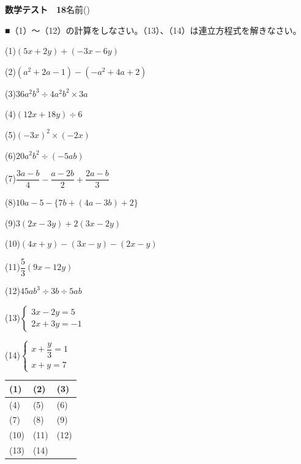 \documentclass[a4paper,11pt]{ltjsarticle}
\newlength{\qcol}\setlength{\qcol}{0.47\textwidth}
\newlength{\qgap}
\newlength{\anscolw}\setlength{\anscolw}{0.30\textwidth}
\newlength{\ansh}
\newcommand{\Q}[2]{\parbox[t]{\qcol}{\raggedright (#1)\hspace{0.6em}$\displaystyle #2$}}
\newcommand{\QR}[4]{\Q{#1}{#2}\hfill\Q{#3}{#4}\par\vspace{\qgap}}
\newcommand{\anscell}[1]{\rule[-\ansdrop]{0pt}{\ansh}(#1)}
\newlength{\ansdrop}
\begin{document}
{\large\bfseries 数学テスト　18}\hfill 名前(\underline{\hspace{32mm}})\par\vspace{3mm}
■（1）〜（12）の計算をしなさい。（13）、（14）は連立方程式を解きなさい。\par\vspace{3mm}
\setlength{\qgap}{11mm}
\QR{1}{(5x+2y)+(-3x-6y)}{2}{(a^2+2a-1)-(-a^2+4a+2)}
\QR{3}{36a^2b^3\div4a^2b^2\times3a}{4}{(12x+18y)\div6}
\QR{5}{(-3x)^2\times(-2x)}{6}{20a^2b^2\div(-5ab)}
\QR{7}{\dfrac{3a-b}{4}-\dfrac{a-2b}{2}+\dfrac{2a-b}{3}}{8}{10a-5-\{7b+(4a-3b)+2\}}
\QR{9}{3(2x-3y)+2(3x-2y)}{10}{(4x+y)-(3x-y)-(2x-y)}
\QR{11}{\dfrac{5}{3}(9x-12y)}{12}{45ab^3\div3b\div5ab}
\QR{13}{\left\{\begin{array}{l} 3x-2y=5 \\ 2x+3y=-1 \end{array}\right.}{14}{\left\{\begin{array}{l} x+\dfrac{y}{3}=1 \\ x+y=7 \end{array}\right.}
\vfill
\setlength{\ansh}{12mm}\setlength{\ansdrop}{8mm}%
\begin{center}\begin{tabular}{|p{\anscolw}|p{\anscolw}|p{\anscolw}|}\hline
\anscell{1} & \anscell{2} & \anscell{3} \\\hline
\anscell{4} & \anscell{5} & \anscell{6} \\\hline
\anscell{7} & \anscell{8} & \anscell{9} \\\hline
\anscell{10} & \anscell{11} & \anscell{12} \\\hline
\anscell{13} & \anscell{14} &  \\\hline
\end{tabular}\end{center}
\end{document}
